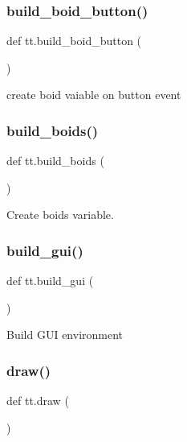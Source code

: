 \subsubsection{\texorpdfstring{build\+\_\+boid\+\_\+button()}{build\_boid\_button()}}
{\footnotesize\ttfamily def tt.\+build\+\_\+boid\+\_\+button (\begin{DoxyParamCaption}{ }\end{DoxyParamCaption})}

\begin{DoxyVerb}create boid vaiable on button event\end{DoxyVerb}
 \mbox{\label{namespacett_a50a93c829314fc1463e7cce7f8af6ae3}} 
\subsubsection{\texorpdfstring{build\+\_\+boids()}{build\_boids()}}
{\footnotesize\ttfamily def tt.\+build\+\_\+boids (\begin{DoxyParamCaption}{ }\end{DoxyParamCaption})}

\begin{DoxyVerb}Create boids variable.\end{DoxyVerb}
 \mbox{\label{namespacett_a4d08caf13001a675cd82fe7c4438d657}} 
\subsubsection{\texorpdfstring{build\+\_\+gui()}{build\_gui()}}
{\footnotesize\ttfamily def tt.\+build\+\_\+gui (\begin{DoxyParamCaption}{ }\end{DoxyParamCaption})}

\begin{DoxyVerb}Build GUI environment \end{DoxyVerb}
 \mbox{\label{namespacett_aa69d28bb0985169625e0b9162f4b1282}} 
\subsubsection{\texorpdfstring{draw()}{draw()}}
{\footnotesize\ttfamily def tt.\+draw (\begin{DoxyParamCaption}{ }\end{DoxyParamCaption})}

